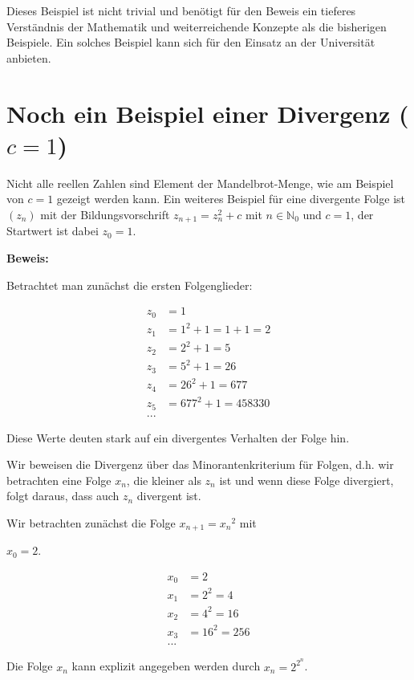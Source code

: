 \documentclass[a4paper, 12pt]{book}
\begin{document}
\hfill\blacksquare

Dieses Beispiel ist nicht trivial und benötigt für den Beweis ein
tieferes Verständnis der Mathematik und weiterreichende Konzepte als die
bisherigen Beispiele. Ein solches Beispiel kann sich für den Einsatz an
der Universität anbieten.

\section{Noch ein Beispiel einer Divergenz ($c=1$)}

Nicht alle reellen Zahlen sind Element der Mandelbrot-Menge, wie am
Beispiel von \(c = 1\) gezeigt werden kann. Ein weiteres Beispiel
für eine divergente Folge ist \(\left( z_{n} \right)\) mit der
Bildungsvorschrift \(z_{n + 1} = z_{n}^{2} + c\) mit
\(n \in \mathbb{N}_{0}\) und \(c = 1\), der Startwert ist dabei
\(z_{0} = 1\).

\textbf{Beweis:}

Betrachtet man zunächst die ersten Folgenglieder:

\begin{align*}
z_{0} &= 1\\
z_{1} &= 1^{2} + 1 = 1 + 1 = 2\\
z_{2} &= 2^{2} + 1 = 5\\
z_{3} &= 5^{2} + 1 = 26\\
z_{4} &= 26^{2} + 1 = 677\\
z_{5} &= 677^{2} + 1 = 458330\\
...
\end{align*}

Diese Werte deuten stark auf ein divergentes Verhalten der Folge hin.

Wir beweisen die Divergenz über das Minorantenkriterium für Folgen, d.h.
wir betrachten eine Folge \(x_{n}\), die kleiner als \(z_{n}\) ist und
wenn diese Folge divergiert, folgt daraus, dass auch \(z_{n}\) divergent
ist.

Wir betrachten zunächst die Folge \(x_{n + 1} = {x_{n}}^{2}\) mit

\(x_{0} = 2\).

\begin{align*}
x_{0} &= 2\\
x_{1} &= 2^{2} = 4\\
x_{2} &= 4^{2} = 16\\
x_{3} &= 16^{2} = 256\\
...
\end{align*}

Die Folge \(x_{n}\) kann explizit angegeben werden durch
\(x_{n} = 2^{2^{n}}\).
\end{document}
